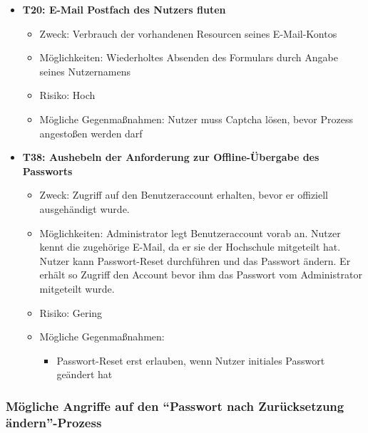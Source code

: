 \documentclass[12pt,DIV14,BCOR10mm,a4paper,parskip=half-,headsepline,headinclude,english,ngerman,bibliography=totocnumbered]{scrreprt}
\begin{document}
\begin{itemize}
  \hypertarget{threat20}{}
  \item \textbf{T20: E-Mail Postfach des Nutzers fluten}
  \begin{itemize}
  \item Zweck: Verbrauch der vorhandenen Resourcen seines E-Mail-Kontos
  \item Möglichkeiten: Wiederholtes Absenden des Formulars durch Angabe seines Nutzernamens
  \item Risiko: Hoch
  \item Mögliche Gegenmaßnahmen: Nutzer muss Captcha lösen, bevor Prozess angestoßen werden darf
  \end{itemize}

  \hypertarget{threat38}{}
  \item \textbf{T38: Aushebeln der Anforderung zur Offline-Übergabe des Passworts}
  \begin{itemize}
  \item Zweck: Zugriff auf den Benutzeraccount erhalten, bevor er offiziell ausgehändigt wurde.
  \item Möglichkeiten: Administrator legt Benutzeraccount vorab an. Nutzer kennt die zugehörige E-Mail, da er sie der Hochschule mitgeteilt hat. Nutzer kann Passwort-Reset durchführen und das Passwort ändern. Er erhält so Zugriff den Account bevor ihm das Passwort vom Administrator mitgeteilt wurde.
  \item Risiko: Gering
  \item Mögliche Gegenmaßnahmen:
  \begin{itemize}
	  \item Passwort-Reset erst erlauben, wenn Nutzer initiales Passwort geändert hat
  \end{itemize}
\end{itemize}
\end{itemize}

\subsubsection{Mögliche Angriffe auf den \enquote{Passwort nach Zurücksetzung ändern}-Prozess}
\end{document}

